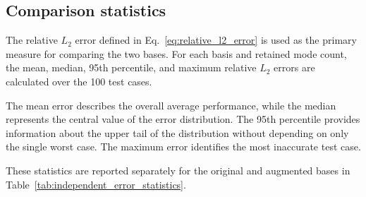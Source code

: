 \subsection{Comparison statistics}

The relative $L_2$ error defined in
Eq.~\eqref{eq:relative_l2_error} is used as the primary
measure for comparing the two bases. For each basis and
retained mode count, the mean, median, 95th percentile,
and maximum relative $L_2$ errors are calculated over
the 100 test cases.

The mean error describes the overall average performance,
while the median represents the central value of the error
distribution. The 95th percentile provides information
about the upper tail of the distribution without depending
on only the single worst case. The maximum error identifies
the most inaccurate test case.

These statistics are reported separately for the original
and augmented bases in Table~\ref{tab:independent_error_statistics}.

